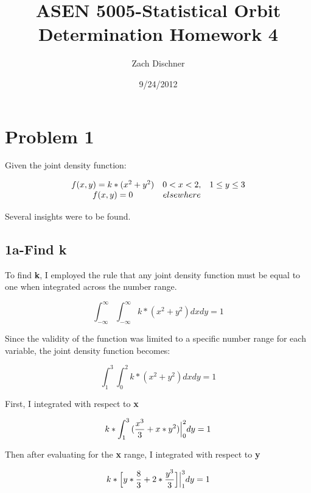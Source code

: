 \documentclass[]{article}
\begin{document}
\title{ASEN 5005-Statistical Orbit Determination
Homework 4}
\author{Zach Dischner}
\date{9/24/2012}
\maketitle

\section{Problem 1}
Given the joint density function:

\[\begin{array}[b]{ccc}
f(x,y)=k*(x^2+y^2)   &  0<x<2,&1\le y\le 3 \cr 
 f(x,y) = 0 & elsewhere & 
\end{array}\]

Several insights were to be found.



\subsection*{1a-Find k} 
To find {\bf k}, I employed the rule that any joint density function must be equal to one when integrated across the number range. 


\begin{equation} 
	 \int_{-\infty}^\infty{\int_{-\infty}^\infty{ k*(x^2 + y^2) } dx dy} = 1 
\end{equation}

\noindent Since the validity of the function was limited to a specific number range for each variable, the joint density function  becomes:

\begin{displaymath}
	\int_1^3{\int_0^2{ k*(x^2 + y^2) } dx dy} = 1 
\end{displaymath}

\noindent First, I integrated with respect to {\bf x}

\begin{displaymath}
	{k*\int_1^3{(\frac{x^3 }{ 3} + x*y^2) } \Big{|}_0^2 dy} = 1 
\end{displaymath}

\noindent Then after evaluating for the {\bf x} range, I integrated with respect to  {\bf y}

\begin{displaymath}
	{k*\Big{ [ } y*\frac{8}{3} + 2*\frac{y^3}{3} \Big{ ] }  \Big{|}_1^3 dy} = 1 
\end{displaymath}
\end{document}
